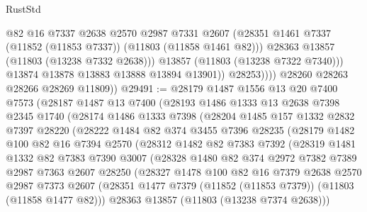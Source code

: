 \begin{lexlean}{RustStd}
\begin{coremodule}
                        @82
                        @16
                        @7337
                        @2638
                        @2570
                        @2987
                        @7331
                        @2607
                        (@28351 @1461 @7337 (@11852 (@11853 @7337)) (@11803 (@11858 @1461 @82)))
                        @28363
                        @13857
                        (@11803 (@13238 @7332 @2638)))
                      @13857
                      (@11803 (@13238 @7322 @7340)))
                    @13874
                    @13878
                    @13883
                    @13888
                    @13894
                    @13901))
                @28253))))
        @28260
        @28263
        @28266
        @28269
        @11809))
@29491 := @28179
    @1487
    @1556
    @13
    @20
    @7400
    @7573
    (@28187
      @1487
      @13
      @7400
      (@28193
        @1486
        @1333
        @13
        @2638
        @7398
        @2345
        @1740
        (@28174
          @1486
          @1333
          @7398
          (@28204
            @1485
            @157
            @1332
            @2832
            @7397
            @28220
            (@28222
              @1484
              @82
              @374
              @3455
              @7396
              @28235
              (@28179
                @1482
                @100
                @82
                @16
                @7394
                @2570
                (@28312
                  @1482
                  @82
                  @7383
                  @7392
                  (@28319
                    @1481
                    @1332
                    @82
                    @7383
                    @7390
                    @3007
                    (@28328
                      @1480
                      @82
                      @374
                      @2972
                      @7382
                      @7389
                      @2987
                      @7363
                      @2607
                      @28250
                      (@28327
                        @1478
                        @100
                        @82
                        @16
                        @7379
                        @2638
                        @2570
                        @2987
                        @7373
                        @2607
                        (@28351 @1477 @7379 (@11852 (@11853 @7379)) (@11803 (@11858 @1477 @82)))
                        @28363
                        @13857
                        (@11803 (@13238 @7374 @2638)))

\end{coremodule}
\end{lexlean}
